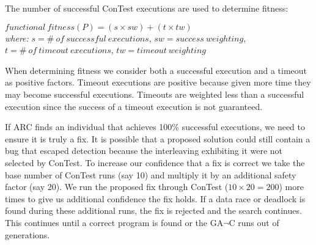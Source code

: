 \documentclass[runningheads,a4paper]{llncs}
\begin{document}
The number of successful ConTest executions are used to determine fitness:
\begin{footnotesize}
\begin{center}
$functional\ fitness(P) = (s \times sw) + (t \times tw)$ \\
\vspace{1.5mm}
\emph{where:} $s = \#\ of\ successful\ executions$, $sw = success\ weighting$, \\
$t = \#\ of\ timeout\ executions$, $tw = timeout\ weighting$
\end{center}
\end{footnotesize}

\noindent When determining fitness we consider both a successful execution and a timeout as positive factors. Timeout executions are positive because given more time they may become successful executions. Timeouts are weighted less than a successful execution since the success of a timeout execution is not guaranteed.

If ARC finds an individual that achieves 100\% successful executions, we need to ensure it is truly a fix. It is possible that a proposed solution could still contain a bug that escaped detection because the interleaving exhibiting it were not selected by ConTest. To increase our confidence that a fix is correct we take the base number of ConTest runs (say 10) and multiply it by an additional safety factor (say 20). We run the proposed fix through ConTest ($10 \times 20 = 200$) more times to give us additional confidence the fix holds.  If a data race or deadlock is found during these additional runs, the fix is rejected and the search continues. This continues until a correct program is found or the GA$\neg$C runs out of generations.

\end{document}
